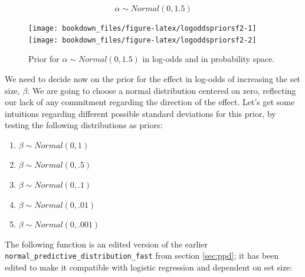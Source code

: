 \documentclass[12pt,]{krantz}
\providecommand{\tightlist}{%
  \setlength{\itemsep}{0pt}\setlength{\parskip}{0pt}}
\theoremstyle{definition}
\theoremstyle{definition}
\theoremstyle{definition}
\theoremstyle{remark}
\begin{document}
\begin{equation}
\alpha \sim Normal(0, 1.5) 
\end{equation}




\begin{figure}
\texttt{[image: bookdown\_files/figure-latex/logoddspriorsf2-1]} \texttt{[image: bookdown\_files/figure-latex/logoddspriorsf2-2]} \caption{Prior for \(\alpha \sim Normal(0, 1.5)\) in
log-odds and in probability space.}\label{fig:logoddspriorsf2}
\end{figure}

We need to decide now on the prior for the effect in log-odds of
increasing the set size, \(\beta\). We are going to choose a normal
distribution centered on zero, reflecting our lack of any commitment
regarding the direction of the effect. Let's get some intuitions
regarding different possible standard deviations for this prior, by
testing the following distributions as priors:

\begin{enumerate}
\def\labelenumi{(\alph{enumi})}
\tightlist
\item
  \(\beta \sim Normal(0, 1)\)
\item
  \(\beta \sim Normal(0, .5)\)
\item
  \(\beta \sim Normal(0, .1)\)
\item
  \(\beta \sim Normal(0, .01)\)
\item
  \(\beta \sim Normal(0, .001)\)
\end{enumerate}

The following function is an edited version of the earlier
\texttt{normal\_predictive\_distribution\_fast} from section
\ref{sec:ppd}; it has been edited to make it compatible with logistic
regression and dependent on set size:
\end{document}
